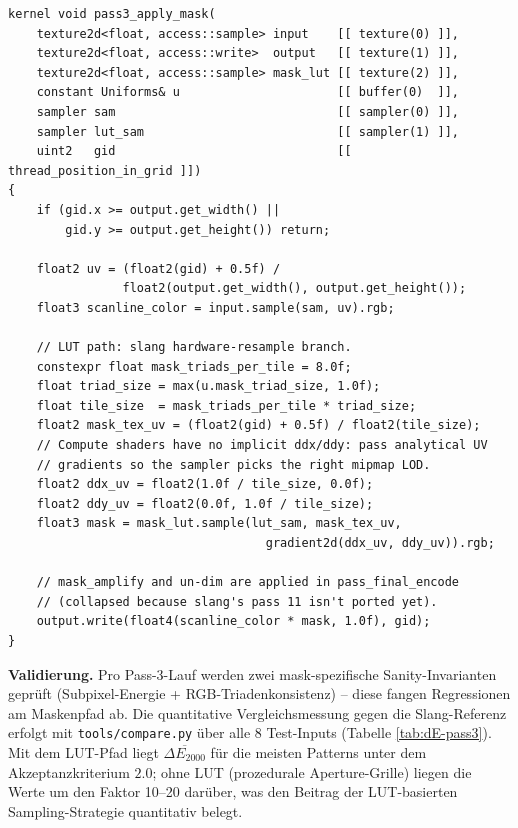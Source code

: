 \documentclass[11pt, a4paper]{article}
\begin{document}
\vspace{.5cm}
\begin{lstlisting}[language=Metal, caption={Pass~3 -- Apply-Mask-Kernel (LUT-Pfad, Slang-\"aquivalent)}]
kernel void pass3_apply_mask(
    texture2d<float, access::sample> input    [[ texture(0) ]],
    texture2d<float, access::write>  output   [[ texture(1) ]],
    texture2d<float, access::sample> mask_lut [[ texture(2) ]],
    constant Uniforms& u                      [[ buffer(0)  ]],
    sampler sam                               [[ sampler(0) ]],
    sampler lut_sam                           [[ sampler(1) ]],
    uint2   gid                               [[ thread_position_in_grid ]])
{
    if (gid.x >= output.get_width() ||
        gid.y >= output.get_height()) return;

    float2 uv = (float2(gid) + 0.5f) /
                float2(output.get_width(), output.get_height());
    float3 scanline_color = input.sample(sam, uv).rgb;

    // LUT path: slang hardware-resample branch.
    constexpr float mask_triads_per_tile = 8.0f;
    float triad_size = max(u.mask_triad_size, 1.0f);
    float tile_size  = mask_triads_per_tile * triad_size;
    float2 mask_tex_uv = (float2(gid) + 0.5f) / float2(tile_size);
    // Compute shaders have no implicit ddx/ddy: pass analytical UV
    // gradients so the sampler picks the right mipmap LOD.
    float2 ddx_uv = float2(1.0f / tile_size, 0.0f);
    float2 ddy_uv = float2(0.0f, 1.0f / tile_size);
    float3 mask = mask_lut.sample(lut_sam, mask_tex_uv,
                                    gradient2d(ddx_uv, ddy_uv)).rgb;

    // mask_amplify and un-dim are applied in pass_final_encode
    // (collapsed because slang's pass 11 isn't ported yet).
    output.write(float4(scanline_color * mask, 1.0f), gid);
}
\end{lstlisting}

\vspace{.5cm}
\textbf{Validierung.} Pro Pass-3-Lauf werden zwei mask-spezifische Sanity-Invarianten gepr\"uft (Subpixel-Energie + RGB-Triadenkonsistenz) -- diese fangen Regressionen am Maskenpfad ab. Die quantitative Vergleichsmessung gegen die Slang-Referenz erfolgt mit \texttt{tools/compare.py} \"uber alle 8 Test-Inputs (Tabelle \ref{tab:dE-pass3}). Mit dem LUT-Pfad liegt $\overline{\Delta E_{2000}}$ f\"ur die meisten Patterns unter dem Akzeptanzkriterium $2.0$; ohne LUT (prozedurale Aperture-Grille) liegen die Werte um den Faktor 10--20 dar\"uber, was den Beitrag der LUT-basierten Sampling-Strategie quantitativ belegt.
\end{document}

